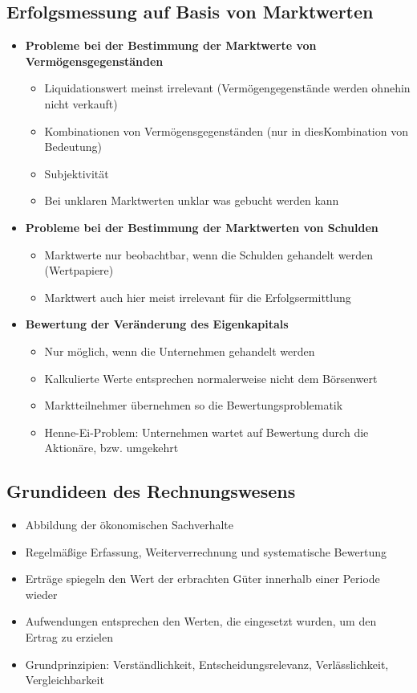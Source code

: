\subsection{Erfolgsmessung auf Basis von Marktwerten}
\begin{itemize}
	\item \textbf{Probleme bei der Bestimmung der Marktwerte von Vermögensgegenständen}
	\begin{itemize}
		\item Liquidationswert meinst irrelevant (Vermögengegenstände werden ohnehin nicht verkauft)
		\item Kombinationen von Vermögensgegenständen (nur in diesKombination von Bedeutung)
		\item Subjektivität
		\item Bei unklaren Marktwerten unklar was gebucht werden kann
	\end{itemize}
	\item \textbf{Probleme bei der Bestimmung der Marktwerten von Schulden}
	\begin{itemize}
		\item Marktwerte nur beobachtbar, wenn die Schulden gehandelt werden (Wertpapiere)
		\item Marktwert auch hier meist irrelevant für die Erfolgsermittlung
	\end{itemize}
	\item \textbf{Bewertung der Veränderung des Eigenkapitals}
	\begin{itemize}
		\item Nur möglich, wenn die Unternehmen gehandelt werden
		\item Kalkulierte Werte entsprechen normalerweise nicht dem Börsenwert
		\item Marktteilnehmer übernehmen so die Bewertungsproblematik
		\item Henne-Ei-Problem: Unternehmen wartet auf Bewertung durch die Aktionäre, bzw. umgekehrt
	\end{itemize}
\end{itemize}


\subsection{Grundideen des Rechnungswesens}
\begin{itemize}
	\item Abbildung der ökonomischen Sachverhalte
	\item Regelmäßige Erfassung, Weiterverrechnung und systematische Bewertung
	\item Erträge spiegeln den Wert der erbrachten Güter innerhalb einer Periode wieder
	\item Aufwendungen entsprechen den Werten, die eingesetzt wurden, um den Ertrag zu erzielen
	\item Grundprinzipien: Verständlichkeit, Entscheidungsrelevanz, Verlässlichkeit, Vergleichbarkeit
\end{itemize}



